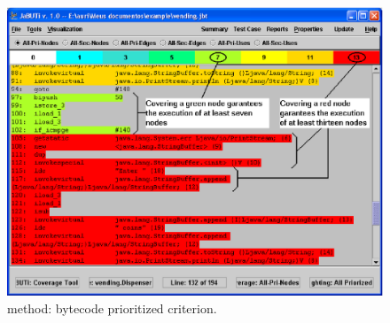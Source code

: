 \begin{figure}[!ht]
\begin{center}
\includegraphics[height=0.40\textheight]{fig/dispenser-bytecode-edited.eps}
\caption{\label{fig:dispenser-bytecode} 
method: bytecode prioritized \wrt {} criterion.}
\end{center}
\end{figure}
